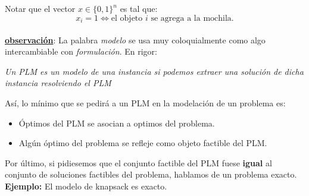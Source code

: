 \documentclass[10pt]{article}
\theoremstyle{plain}
\theoremstyle{definition}
\newcommand{\ssi}{\Longleftrightarrow}
\begin{document}
Notar que el vector $x \in \{0,1\}^n$ es tal que:
$$
x_i =1 \ssi \text{el objeto $i$ se agrega a la mochila.}
$$\\

\underline{\textbf{observación}}: La palabra \textit{modelo} se usa muy coloquialmente como algo intercambiable con \textit{formulación}. En rigor:

\begin{center}
\textit{Un PLM es un modelo de una instancia si podemos extraer una solución de dicha instancia resolviendo el PLM}
\end{center}

Así, lo mínimo que se pedirá a un PLM en la modelación de un problema es:
\begin{itemize}
\item Óptimos del PLM se asocian a optimos del problema.
\item Algún óptimo del problema se refleje como objeto factible del PLM.
\end{itemize}
Por último, si pidiesemos que el conjunto factible del PLM fuese \textbf{igual} al conjunto de soluciones factibles del problema, hablamos de un problema exacto.\\

\textbf{Ejemplo:} El modelo de knapsack es exacto.\\
\end{document}
